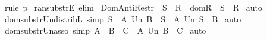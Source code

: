 \begin{isabellebody}
\isamarkupfalse%
\ {\isacharparenleft}rule\ p{}{\isacharparenright}\isanewline
{}\isamarkupfalse%
%
\endisatagproof
{\isafoldproof}%
%
\isadelimproof
\isanewline
%
\endisadelimproof
{}\isamarkupfalse%
\ ran{\isacharunderscore}substrE\ {\isacharbrackleft}elim{\isacharbang}{\isacharbrackright}\isanewline
\isanewline
{}\isamarkupfalse%
\ Dom{\isacharunderscore}Anti{\isacharunderscore}Restr\ {\isacharcolon}\ {\isachardoublequoteopen}{\isacharparenleft}S\ {\isacharless}{\isacharminus}{\isacharcolon}\ R{\isacharparenright}\ {\isacharequal}\ {\isacharparenleft}dom{\isacharparenleft}R{\isacharparenright}\ {\isacharminus}\ S{\isacharparenright}\ {\isacharless}{\isacharcolon}\ R{\isachardoublequoteclose}\isanewline
%
\isadelimproof
%
\endisadelimproof
%
\isatagproof
{}\isamarkupfalse%
\ auto\isanewline
{}\isamarkupfalse%
%
\endisatagproof
{\isafoldproof}%
%
\isadelimproof
\isanewline
%
\endisadelimproof
\isanewline
{}\isamarkupfalse%
\ dom{\isacharunderscore}substr{\isacharunderscore}Un{\isacharunderscore}distribL\ {\isacharbrackleft}simp{\isacharbrackright}{\isacharcolon}\ {\isachardoublequoteopen}{\isacharparenleft}S\ {\isacharless}{\isacharminus}{\isacharcolon}\ {\isacharparenleft}A\ Un\ B{\isacharparenright}{\isacharparenright}\ {\isacharequal}\ {\isacharparenleft}{\isacharparenleft}S\ {\isacharless}{\isacharminus}{\isacharcolon}\ A{\isacharparenright}\ Un\ {\isacharparenleft}S\ {\isacharless}{\isacharminus}{\isacharcolon}\ B{\isacharparenright}{\isacharparenright}{\isachardoublequoteclose}\isanewline
%
\isadelimproof
%
\endisadelimproof
%
\isatagproof
{}\isamarkupfalse%
\ auto\isanewline
{}\isamarkupfalse%
%
\endisatagproof
{\isafoldproof}%
%
\isadelimproof
\isanewline
%
\endisadelimproof
\isanewline
{}\isamarkupfalse%
\ dom{\isacharunderscore}substr{\isacharunderscore}Un{\isacharunderscore}asso\ {\isacharbrackleft}simp{\isacharbrackright}{\isacharcolon}\ {\isachardoublequoteopen}{\isacharparenleft}A\ {\isacharless}{\isacharminus}{\isacharcolon}\ {\isacharparenleft}B\ {\isacharless}{\isacharminus}{\isacharcolon}\ C{\isacharparenright}{\isacharparenright}\ {\isacharequal}\ {\isacharparenleft}{\isacharparenleft}A\ Un\ B{\isacharparenright}\ {\isacharless}{\isacharminus}{\isacharcolon}\ C{\isacharparenright}{\isachardoublequoteclose}\isanewline
%
\isadelimproof
%
\endisadelimproof
%
\isatagproof
{}\isamarkupfalse%
\ auto\isanewline
{}\isamarkupfalse%
%
\endisatagproof

\end{isabellebody}
